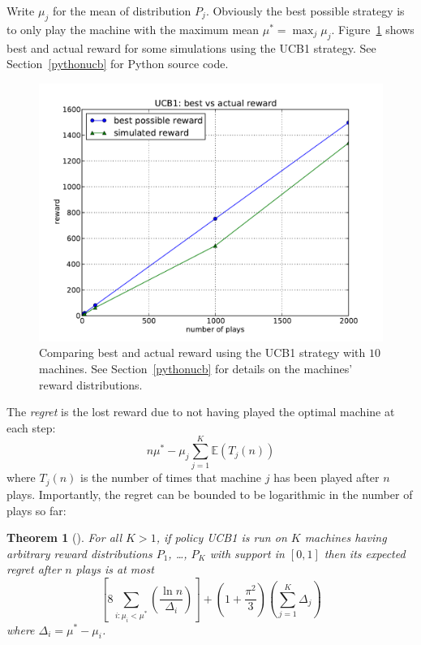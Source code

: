 \documentclass[12pt,amstags,fleqn]{article}
\theoremstyle{plain}
\newtheorem{theorem}{Theorem}[section]
\theoremstyle{definition}
\theoremstyle{definition}
\begin{document}
Write $\mu_j$ for the mean of distribution $P_j$. Obviously the best
possible strategy is to only play the machine with the maximum mean
$\mu^* = \max_j{\mu_j}$. Figure~\ref{figucbreward} shows best and actual
reward for some simulations using the UCB1 strategy.
See Section~\ref{pythonucb} for Python source code.
\begin{figure}[htb]
\begin{center}
\includegraphics[width=.75\textwidth]{best_and_total_reward.pdf}
\end{center}
\caption{Comparing best and actual reward using the UCB1 strategy with
$10$ machines. See Section~\ref{pythonucb} for details on the machines' reward
distributions.}\label{figucbreward}
\end{figure}
The {\em regret} is the lost reward due to not having played the optimal
machine at each step:
\[
n \mu^* - \mu_j \sum_{j=1}^K \mathbb{E}(T_j(n))
\]
where $T_j(n)$ is the number of times that machine $j$ has been played
after $n$ plays. Importantly, the regret can be bounded to be
logarithmic in the number of plays so far:

\begin{theorem}[\cite{Auer:2002}]\label{thmUCB}
For all $K > 1$, if policy \textnormal{UCB1} is run on $K$ machines
having arbitrary reward distributions $P_1$, \dots, $P_K$ with support
in $[0,1]$ then its expected regret after $n$ plays is at most
\[
\left[ 8 \sum_{i:\mu_i < \mu^*} \left( \frac{\ln n}{\Delta_i} \right)  \right] + 
\left( 1 + \frac{\pi^2}{3} \right)
\left( \sum_{j=1}^K \Delta_j \right)
\]
where $\Delta_i = \mu^* - \mu_i$.
\end{theorem}
\end{document}
